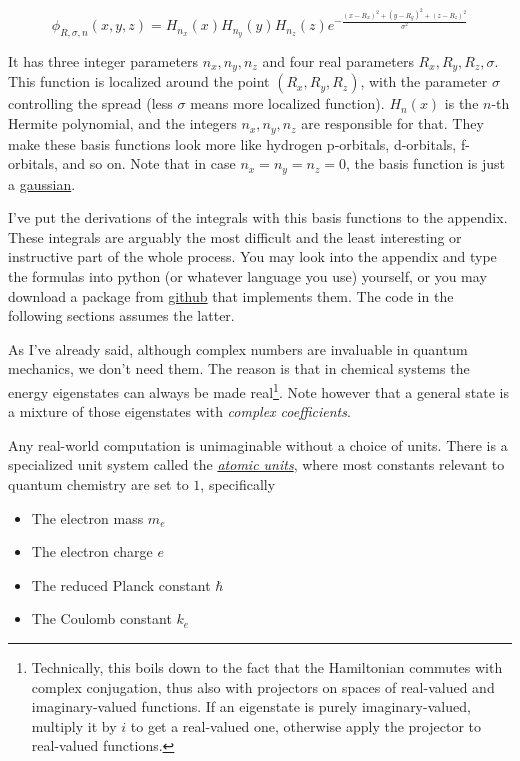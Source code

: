 \documentclass{article}
\newcommand{\githubrepo}{https://github.com/lisyarus/chembook}
\begin{document}
\begin{equation}
\phi_{R,\sigma,n}(x,y,z) = H_{n_x}(x)H_{n_y}(y)H_{n_z}(z) e^{-\frac{(x-R_x)^2+(y-R_y)^2+(z-R_z)^2}{\sigma^2}}
\end{equation}

It has three integer parameters \(n_x,n_y,n_z\) and four real parameters \(R_x,R_y,R_z,\sigma\). This function is localized around the point \((R_x,R_y,R_z)\), with the parameter \(\sigma\) controlling the spread (less \(\sigma\) means more localized function). \(H_n(x)\) is the \(n\)-th Hermite polynomial, and the integers \(n_x,n_y,n_z\) are responsible for that. They make these basis functions look more like hydrogen p-orbitals, d-orbitals, f-orbitals, and so on. Note that in case \(n_x=n_y=n_z=0\), the basis function is just a \href{https://en.wikipedia.org/wiki/Gaussian_function}{gaussian}.

I've put the derivations of the integrals with this basis functions to the appendix. These integrals are arguably the most difficult and the least interesting or instructive part of the whole process. You may look into the appendix and type the formulas into python (or whatever language you use) yourself, or you may download a package from \href{\githubrepo/blob/master/code/hgto.py}{github} that implements them. The code in the following sections assumes the latter.

As I've already said, although complex numbers are invaluable in quantum mechanics, we don't need them. The reason is that in chemical systems the energy eigenstates can always be made real\footnote{Technically, this boils down to the fact that the Hamiltonian commutes with complex conjugation, thus also with projectors on spaces of real-valued and imaginary-valued functions. If an eigenstate is purely imaginary-valued, multiply it by \(i\) to get a real-valued one, otherwise apply the projector to real-valued functions.}. Note however that a general state is a mixture of those eigenstates with \textit{complex coefficients}.

Any real-world computation is unimaginable without a choice of units. There is a specialized unit system called the \href{https://en.wikipedia.org/wiki/Hartree_atomic_units}{\textit{atomic units}}, where most constants relevant to quantum chemistry are set to \(1\), specifically

\begin{itemize}
\item The electron mass \(m_e\)
\item The electron charge \(e\)
\item The reduced Planck constant \(\hbar\)
\item The Coulomb constant \(k_e\)
\end{itemize}
\end{document}
